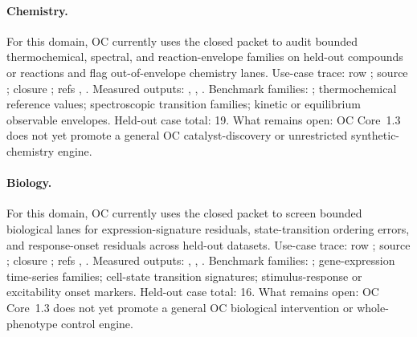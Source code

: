 \paragraph{Chemistry.}
For this domain, OC currently uses the closed packet to audit bounded thermochemical, spectral, and reaction-envelope families on held-out compounds or reactions and flag out-of-envelope chemistry lanes.
Use-case trace: row ; \allowbreak source ; \allowbreak closure ; \allowbreak refs , \allowbreak {}.
Measured outputs: , , .
Benchmark families: ; thermochemical reference values; spectroscopic transition families; kinetic or equilibrium observable envelopes.
Held-out case total: 19.
What remains open: OC Core~1.3 does not yet promote a general OC catalyst-discovery or unrestricted synthetic-chemistry engine.

\paragraph{Biology.}
For this domain, OC currently uses the closed packet to screen bounded biological lanes for expression-signature residuals, state-transition ordering errors, and response-onset residuals across held-out datasets.
Use-case trace: row ; \allowbreak source ; \allowbreak closure ; \allowbreak refs , \allowbreak {}.
Measured outputs: , , .
Benchmark families: ; gene-expression time-series families; cell-state transition signatures; stimulus-response or excitability onset markers.
Held-out case total: 16.
What remains open: OC Core~1.3 does not yet promote a general OC biological intervention or whole-phenotype control engine.

